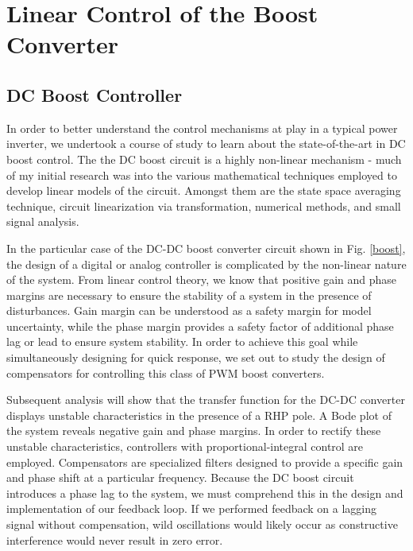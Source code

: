 
\chapter{Linear Control of the Boost Converter} %

\label{Chapter4} %



\section{DC Boost Controller}
In order to better understand the control mechanisms at play in a typical power inverter, we undertook a course of study to learn about the state-of-the-art in DC boost control. The the DC boost circuit is a highly non-linear mechanism - much of my initial research was into the various mathematical techniques employed to develop linear models of the circuit. Amongst them are the state space averaging technique, circuit linearization via transformation, numerical methods, and small signal analysis.

In the particular case of the DC-DC boost converter circuit shown in Fig. \ref{boost}, the design of a digital or analog controller is complicated by the non-linear nature of the system. From linear control theory, we know that positive gain and phase margins are necessary to ensure the stability of a system in the presence of disturbances. Gain margin can be understood as a safety margin for model uncertainty, while the phase margin provides a safety factor of additional phase lag or lead to ensure system stability. In order to achieve this goal while simultaneously designing for quick response, we set out to study the design of compensators for controlling this class of PWM boost converters. 

Subsequent analysis will show that the transfer function for the DC-DC converter displays unstable characteristics in the presence of a RHP pole. A Bode plot of the system reveals negative gain and phase margins. In order to rectify these unstable characteristics, controllers with proportional-integral control are employed. Compensators are specialized filters designed to provide a specific gain and phase shift at a particular frequency. Because the DC boost circuit introduces a phase lag to the system, we must comprehend this in the design and implementation of our feedback loop. If we performed feedback on a lagging signal without compensation, wild oscillations would likely occur as constructive interference would never result in zero error. 


